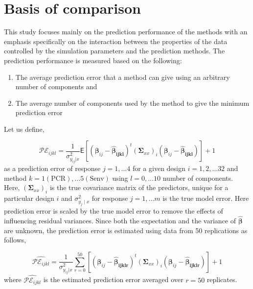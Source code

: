 \documentclass[review]{elsarticle}
\providecommand{\tightlist}{%
  \setlength{\itemsep}{0pt}\setlength{\parskip}{0pt}}
\begin{document}
\hypertarget{basis-of-comparison}{%
\section{Basis of comparison}\label{basis-of-comparison}}

This study focuses mainly on the prediction performance of the methods with an emphasis specifically on the interaction between the properties of the data controlled by the simulation parameters and the prediction methods. The prediction performance is measured based on the following:

\begin{enumerate}
\def\labelenumi{\alph{enumi})}
\tightlist
\item
  The average prediction error that a method can give using an arbitrary number of components and
\item
  The average number of components used by the method to give the minimum prediction error
\end{enumerate}

Let us define,

\begin{equation}
\mathcal{PE}_{ijkl} = \frac{1}{\sigma_{y_{ij}|x}^2}
  \mathsf{E}{\left[\left(\boldsymbol{\beta}_{ij} -
  \boldsymbol{\hat{\beta}_{ijkl}}\right)^t
  \left(\boldsymbol{\Sigma}_{xx}\right)_i
  \left(\boldsymbol{\beta}_{ij} - \boldsymbol{\hat{\beta}_{ijkl}}\right)\right]} + 1
\label{eq:pred-error}
\end{equation}
as a prediction error of response \(j = 1, \ldots 4\) for a given design \(i=1, 2, \ldots 32\) and method \(k=1(\text{PCR}), \ldots 5(\text{Senv})\) using \(l=0, \ldots 10\) number of components. Here, \(\left(\boldsymbol{\Sigma}_{xx}\right)_i\) is the true covariance matrix of the predictors, unique for a particular design \(i\) and \(\sigma_{y_j\mid x}^2\) for response \(j = 1, \ldots m\) is the true model error. Here prediction error is scaled by the true model error to remove the effects of influencing residual variances. Since both the expectation and the variance of \(\hat{\boldsymbol{\beta}}\) are unknown, the prediction error is estimated using data from 50 replications as follows,

\begin{equation}
\widehat{\mathcal{PE}_{ijkl}} = \frac{1}{\sigma_{y_{ij}|x}^2}
  \sum_{r=0}^{50}{\left[\left(\boldsymbol{\beta}_{ij} -
  \boldsymbol{\hat{\beta}_{ijklr}}\right)^t
  \left(\boldsymbol{\Sigma}_{xx}\right)_i
  \left(\boldsymbol{\beta}_{ij} - \boldsymbol{\hat{\beta}_{ijklr}}\right)\right]} + 1
\label{eq:estimated-pred-error}
\end{equation}
where \(\widehat{\mathcal{PE}_{ijkl}}\) is the estimated prediction error averaged over \(r=50\) replicates.
\end{document}
